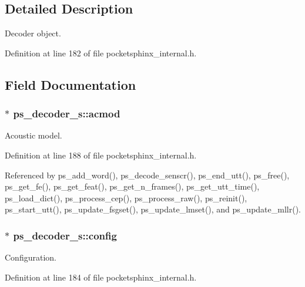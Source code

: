 \subsection{\-Detailed \-Description}
\-Decoder object. 

\-Definition at line 182 of file pocketsphinx\-\_\-internal.\-h.



\subsection{\-Field \-Documentation}
\subsubsection[{acmod}]{$\ast$ {\bf ps\-\_\-decoder\-\_\-s\-::acmod}}\label{structps__decoder__s_af834d2bc1d44c1d9ef607b025413a0b8}


\-Acoustic model. 



\-Definition at line 188 of file pocketsphinx\-\_\-internal.\-h.



\-Referenced by ps\-\_\-add\-\_\-word(), ps\-\_\-decode\-\_\-senscr(), ps\-\_\-end\-\_\-utt(), ps\-\_\-free(), ps\-\_\-get\-\_\-fe(), ps\-\_\-get\-\_\-feat(), ps\-\_\-get\-\_\-n\-\_\-frames(), ps\-\_\-get\-\_\-utt\-\_\-time(), ps\-\_\-load\-\_\-dict(), ps\-\_\-process\-\_\-cep(), ps\-\_\-process\-\_\-raw(), ps\-\_\-reinit(), ps\-\_\-start\-\_\-utt(), ps\-\_\-update\-\_\-fsgset(), ps\-\_\-update\-\_\-lmset(), and ps\-\_\-update\-\_\-mllr().

\subsubsection[{config}]{$\ast$ {\bf ps\-\_\-decoder\-\_\-s\-::config}}\label{structps__decoder__s_a0565ed97b32408bd05c8104f020cef05}


\-Configuration. 



\-Definition at line 184 of file pocketsphinx\-\_\-internal.\-h.



